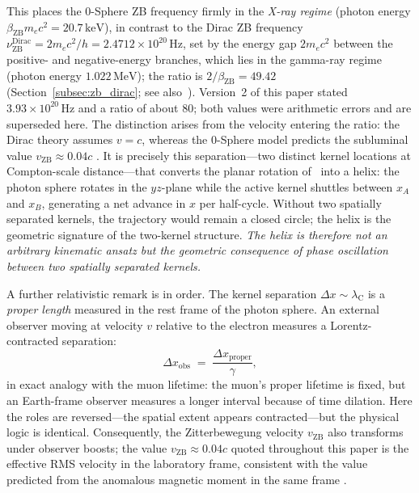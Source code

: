 \documentclass[%
 reprint, amsmath,amssymb, aps, prb, ]{revtex4-2}
\numberwithin{equation}{section}
\newcommand{\lambdaC}{\lambda_{\mathrm{C}}}
\begin{document}
This places the 0-Sphere ZB frequency firmly in the \emph{X-ray regime} (photon energy $\beta_{\mathrm{ZB}}m_ec^2 = 20.7\,\mathrm{keV}$), in contrast to the Dirac ZB frequency $\nu_{\mathrm{ZB}}^{\mathrm{Dirac}} = 2m_ec^2/h = 2.4712\times10^{20}\,\mathrm{Hz}$, set by the energy gap $2m_ec^2$ between the positive- and negative-energy branches, which lies in the gamma-ray regime (photon energy $1.022\,\mathrm{MeV}$); the ratio is $2/\beta_{\mathrm{ZB}} = 49.42$ (Section~\ref{subsec:zb_dirac}; see also~\cite{hanamura66}). Version~2 of this paper stated $3.93\times10^{20}\,\mathrm{Hz}$ and a ratio of about $80$; both values were arithmetic errors and are superseded here. The distinction arises from the velocity entering the ratio: the Dirac theory assumes $v = c$, whereas the 0-Sphere model predicts the subluminal value $v_\mathrm{ZB} \approx 0.04c$ \cite{hanamura10, hanamura36}. It is precisely this separation---two distinct kernel locations at Compton-scale distance---that converts the planar rotation of~\cite{hanamura50} into a helix: the photon sphere rotates in the $yz$-plane while the active kernel shuttles between $x_A$ and $x_B$, generating a net advance in $x$ per half-cycle. Without two spatially separated kernels, the trajectory would remain a closed circle; the helix is the geometric signature of the two-kernel structure. \emph{The helix is therefore not an arbitrary kinematic ansatz but the geometric consequence of phase oscillation between two spatially separated kernels.}

A further relativistic remark is in order. The kernel separation $\Delta x \sim \lambdaC$ is a \emph{proper length} measured in the rest frame of the photon sphere. An external observer moving at velocity $v$ relative to the electron measures a Lorentz-contracted separation:
\begin{equation}
\Delta x_{\text{obs}} \;=\; \frac{\Delta x_{\text{proper}}}{\gamma},
\label{eq:lorentz_separation}
\end{equation}
in exact analogy with the muon lifetime: the muon's proper lifetime is fixed, but an Earth-frame observer measures a longer interval because of time dilation. Here the roles are reversed---the spatial extent appears contracted---but the physical logic is identical. Consequently, the Zitterbewegung velocity $v_\mathrm{ZB}$ also transforms under observer boosts; the value $v_\mathrm{ZB} \approx 0.04c$ quoted throughout this paper is the effective RMS velocity in the laboratory frame, consistent with the value predicted from the anomalous magnetic moment in the same frame \cite{hanamura10, hanamura36}.
\end{document}
